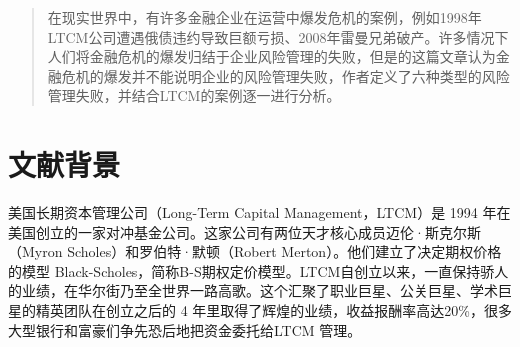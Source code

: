 \begin{abstract}
    在现实世界中，有许多金融企业在运营中爆发危机的案例，例如1998年LTCM公司遭遇俄债违约导致巨额亏损、2008年雷曼兄弟破产。许多情况下人们将金融危机的爆发归结于企业风险管理的失败，但是\citeauthor{stulz2008risk}的这篇文章认为金融危机的爆发并不能说明企业的风险管理失败，作者定义了六种类型的风险管理失败，并结合LTCM的案例逐一进行分析。
\end{abstract}
\section{文献背景}
美国长期资本管理公司（Long-Term Capital Management，LTCM）是 1994 年在美国创立的一家对冲基金公司。这家公司有两位天才核心成员迈伦·斯克尔斯（Myron Scholes）和罗伯特·默顿（Robert Merton）。他们建立了决定期权价格的模型 Black-Scholes，简称B-S期权定价模型。LTCM自创立以来，一直保持骄人的业绩，在华尔街乃至全世界一路高歌。这个汇聚了职业巨星、公关巨星、学术巨星的精英团队在创立之后的 4 年里取得了辉煌的业绩，收益报酬率高达20\%，很多大型银行和富豪们争先恐后地把资金委托给LTCM 管理。
